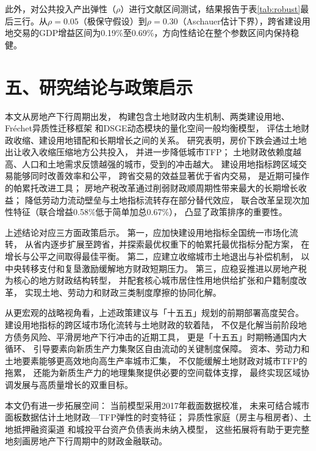 \documentclass[UTF8,a4paper,12pt]{ctexart}
\theoremstyle{plain}
\theoremstyle{definition}
\theoremstyle{remark}
\begin{document}
此外，对公共投入产出弹性（$\rho$）进行文献区间测试，结果报告于表\ref{tab:robust}最后三行。从$\rho=0.05$（极保守假设）到$\rho=0.30$（Aschauer估计下界），跨省建设用地交易的GDP增益区间为0.19\%至0.69\%，方向性结论在整个参数区间内保持稳健。

\section{五、研究结论与政策启示}

本文从房地产下行周期出发，
构建包含土地财政内生机制、两类建设用地、Fréchet异质性迁移框架
和DSGE动态模块的量化空间一般均衡模型，
评估土地财政收缩、建设用地错配和长期增长之间的关系。
研究表明，房价下跌会通过土地出让收入收缩压缩地方公共投入，
并进一步降低城市TFP；
土地财政依赖度越高、人口和土地需求反馈越强的城市，受到的冲击越大。
建设用地指标跨区域交易能够同时改善效率和公平，
跨省交易的效益显著优于省内交易，
是近期可操作的帕累托改进工具；
房地产税改革通过削弱财政顺周期性带来最大的长期增长收益；
降低劳动力流动壁垒与土地指标流转存在部分替代效应，
联合改革呈现次加性特征（联合增益0.58\%低于简单加总0.67\%），
凸显了政策排序的重要性。

上述结论对应三方面政策启示。
第一，应加快建设用地指标全国统一市场化流转，
从省内逐步扩展至跨省，并探索最优权重下的帕累托最优指标分配方案，
在增长与公平之间取得最佳平衡。
第二，应建立收缩城市土地退出与补偿机制，
以中央转移支付和复垦激励缓解地方财政短期压力。
第三，应稳妥推进以房地产税为核心的地方财政结构转型，
并配套核心城市居住性用地供给扩张和户籍制度改革，
实现土地、劳动力和财政三类制度摩擦的协同化解。

从更宏观的战略视角看，上述政策建议与「十五五」规划的前期部署高度契合。
建设用地指标的跨区域市场化流转与土地财政的软着陆，
不仅是化解当前阶段地方债务风险、平滑房地产下行冲击的近期工具，
更是「十五五」时期畅通国内大循环、
引导要素向新质生产力集聚区自由流动的关键制度保障。
资本、劳动力和土地要素能够更高效地向高生产率城市汇集，
不仅能缓解土地财政对城市TFP的拖累，
还能为新质生产力的地理集聚提供必要的空间载体支撑，
最终实现区域协调发展与高质量增长的双重目标。

本文仍有进一步拓展空间：
当前模型采用2017年截面数据校准，
未来可结合城市面板数据估计土地财政—TFP弹性的时变特征；
异质性家庭（房主与租房者）、土地抵押融资渠道
和城投平台资产负债表尚未纳入模型，
这些拓展将有助于更完整地刻画房地产下行周期中的财政金融联动。

\end{document}
